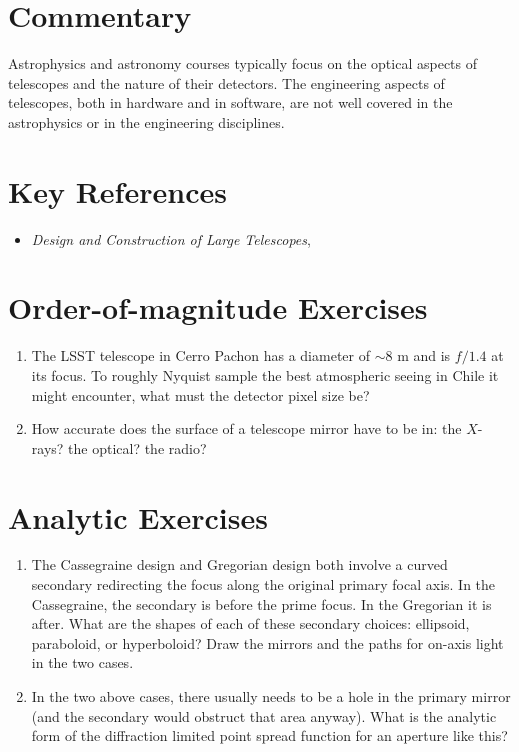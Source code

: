 \section{Commentary}

Astrophysics and astronomy courses typically focus on the optical
aspects of telescopes and the nature of their detectors.  The
engineering aspects of telescopes, both in hardware and in software,
are not well covered in the astrophysics or in the engineering
disciplines.

\section{Key References}

\begin{itemize}
  \item
    {\it Design and Construction of Large Telescopes},
      \citet{bely}
\end{itemize}

\citet{gunn06a}

\section{Order-of-magnitude Exercises}

\begin{enumerate} 
\item The LSST telescope in Cerro Pachon has a diameter of $\sim 8$ m
    and is $f/1.4$ at its focus. To roughly Nyquist sample the best
    atmospheric seeing in Chile it might encounter, what must the
    detector pixel size be?

\item How accurate does the surface of a telescope mirror have to be
    in: the $X$-rays? the optical? the radio?
\end{enumerate} 

\section{Analytic Exercises}

\begin{enumerate}
\item The Cassegraine design and Gregorian design both involve a
curved secondary redirecting the focus along the original primary
focal axis. In the Cassegraine, the secondary is before the prime
focus. In the Gregorian it is after. What are the shapes of each of
these secondary choices: ellipsoid, paraboloid, or hyperboloid? Draw
the mirrors and the paths for on-axis light in the two cases.
\item In the two above cases, there usually needs to be a hole in the
primary mirror (and the secondary would obstruct that area anyway).
What is the analytic form of the diffraction limited point spread
function for an aperture like this?
\end{enumerate}

